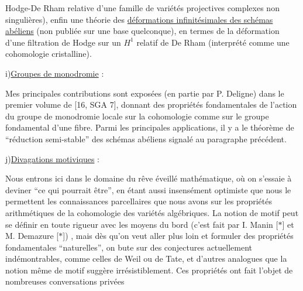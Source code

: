 
Hodge-De Rham relative d'une famille de variétés
projectives complexes non singulières), enfin une
théorie des \uline{déformations infinitésimales des schémas}
\uline{abéliens} (non publiée sur une base quelconque), en
termes de la déformation d'une filtration de Hodge sur
un $H^{1}$ relatif de De Rham (interprété comme une
cohomologie cristalline).

i)\quad \uline{Groupes de monodromie} :

\qquad Mes principales contributions sont exposées
(en partie par P. Deligne) dans le premier volume
de [16, SGA 7], donnant des propriétés fondamentales
de l'action du groupe de monodromie locale sur la
cohomologie comme sur le groupe fondamental d'une fibre.
Parmi les principales applications, il y a le théorème
de ``réduction semi-stable'' des schémas abéliens signalé
au paragraphe précédent.

j)\quad \uline{Divagations motiviques} :

\qquad Nous entrons ici dans le domaine du rêve
éveillé mathématique, où on s'essaie à deviner ``ce qui
pourrait être'', en étant aussi insensément optimiste
que nous le permettent les connaissances parcellaires
que nous avons sur les propriétés arithmétiques de la
cohomologie des variétés algébriques. La notion de
motif peut se définir en toute rigueur avec les moyens
du bord (c'est fait par I. Manin [$*$] et M. Demazure [$*$]) ,
mais dès qu'on veut aller plus loin et formuler des
propriétés fondamentales ``naturelles'', on bute sur des
conjectures actuellement indémontrables, comme celles
de Weil ou de Tate, et d'autres analogues que la notion
même de motif suggère irrésistiblement. Ces propriétés
ont fait l'objet de nombreuses conversations privées

